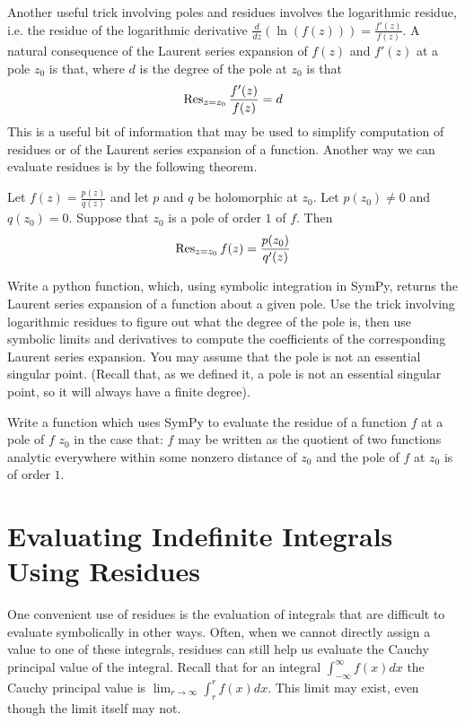 Another useful trick involving poles and residues involves the logarithmic residue, i.e. the residue of the logarithmic derivative $\frac{d}{dz}(\ln(f(z))) = \frac{f'(z)}{f(z)}$.
A natural consequence of the Laurent series expansion of $f(z)$ and $f'(z)$ at a pole $z_0$ is that, where $d$ is the degree of the pole at $z_0$ is that
\begin{equation*}
\operatorname{Res}_{z=z_0} \frac{f'(z)}{f(z)} = d
\end{equation*}
This is a useful bit of information that may be used to simplify computation of residues or of the Laurent series expansion of a function. 
Another way we can evaluate residues is by the following theorem.
\begin{theorem}
Let $f(z)=\frac{p(z)}{q(z)}$ and let $p$ and $q$ be holomorphic at $z_0$. Let $p(z_0) \neq 0$ and $q(z_0)=0$. Suppose that $z_0$ is a pole of order $1$ of $f$. Then 
\begin{equation*}
\operatorname{Res}_{z=z_0} f(z) = \frac{p(z_0)}{q'(z)}
\end{equation*}
\end{theorem}

\begin{problem}
Write a python function, which, using symbolic integration in SymPy, returns the Laurent series expansion of a function about a given pole.
Use the trick involving logarithmic residues to figure out what the degree of the pole is, then use symbolic limits and derivatives to compute the coefficients of the corresponding Laurent series expansion.
You may assume that the pole is not an essential singular point.
(Recall that, as we defined it, a pole is not an essential singular point, so it will always have a finite degree).
\end{problem}

\begin{problem}
Write a function which uses SymPy to evaluate the residue of a function $f$ at a pole of $f$ $z_0$ in the case that: $f$ may be written as the quotient of two functions analytic everywhere within some nonzero distance of $z_0$ and the pole of $f$ at $z_0$ is of order $1$.
\end{problem}

\section*{Evaluating Indefinite Integrals Using Residues}

One convenient use of residues is the evaluation of integrals that are difficult to evaluate symbolically in other ways.
Often, when we cannot directly assign a value to one of these integrals, residues can still help us evaluate the Cauchy principal value of the integral.
Recall that for an integral $\int_{-\infty}^{\infty} f(x)dx$ the Cauchy principal value is $\lim_{r\to \infty} \int_{r}^{r} f(x) dx$. This limit may exist, even though the limit itself may not.

